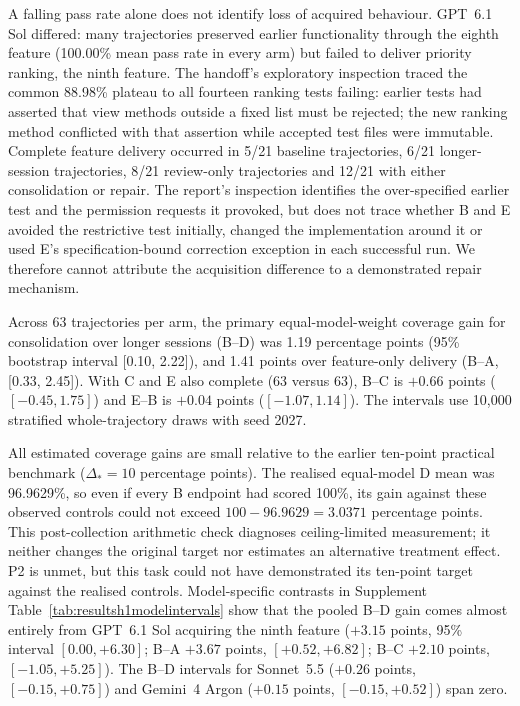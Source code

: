 A falling pass rate alone does not identify loss of acquired behaviour.
GPT~6.1 Sol differed: many trajectories preserved earlier
functionality through the eighth feature (100.00\% mean pass rate in every arm) but
failed to deliver priority ranking, the ninth feature.
The handoff's exploratory inspection traced the common 88.98\% plateau to
all fourteen ranking tests failing: earlier tests had asserted that view
methods outside a fixed list must be rejected; the new ranking method
conflicted with that assertion while accepted test files were immutable. Complete feature delivery occurred in 5/21 baseline trajectories, 6/21
longer-session trajectories, 8/21 review-only trajectories and 12/21 with
either consolidation or repair. The report's inspection identifies the
over-specified earlier test and the permission requests it provoked, but
does not trace whether B and E avoided the restrictive test initially,
changed the implementation around it or used E's specification-bound
correction exception in each successful run. We therefore cannot attribute
the acquisition difference to a demonstrated repair mechanism.

Across 63 trajectories per arm, the primary equal-model-weight coverage
gain for consolidation over longer sessions (B--D) was 1.19 percentage
points (95\% bootstrap
interval [0.10, 2.22]), and 1.41 points over feature-only delivery (B--A,
[0.33, 2.45]). With C and E also complete (63 versus 63), B--C is $+0.66$
points ($[-0.45, 1.75]$) and E--B is $+0.04$ points ($[-1.07, 1.14]$). The
intervals use 10,000 stratified whole-trajectory draws with seed 2027.

All estimated coverage gains are small relative to the earlier ten-point
practical benchmark ($\Delta_*=10$ percentage points).
The realised equal-model D mean was 96.9629\%, so even if every B endpoint
had scored 100\%, its gain against these observed controls could not exceed
$100-96.9629=3.0371$ percentage points. This post-collection arithmetic
check diagnoses ceiling-limited measurement; it neither changes the
original target nor estimates an alternative treatment effect. P2 is
unmet, but this task could not have demonstrated its ten-point target
against the realised controls.
Model-specific
contrasts in Supplement Table~\ref{tab:resultsh1modelintervals} show that
the pooled B--D gain comes almost entirely from GPT~6.1 Sol
acquiring the ninth feature ($+3.15$ points, 95\% interval $[0.00,+6.30]$;
B--A $+3.67$ points, $[+0.52,+6.82]$; B--C $+2.10$ points,
$[-1.05,+5.25]$).
The B--D intervals for Sonnet~5.5 ($+0.26$
points, $[-0.15,+0.75]$) and Gemini~4 Argon ($+0.15$ points,
$[-0.15,+0.52]$) span zero.

